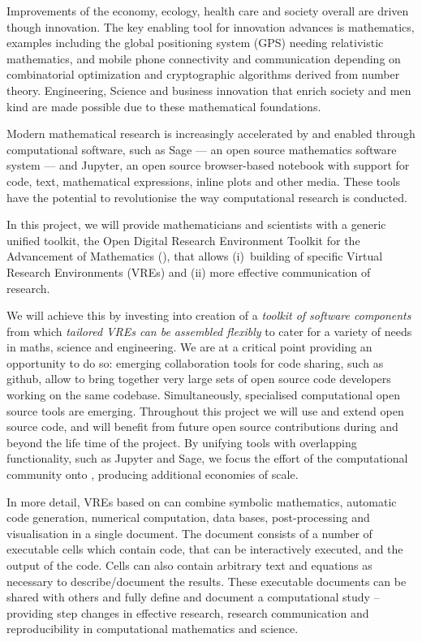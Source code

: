 Improvements of the economy, ecology, health care and society overall
are driven though innovation. The key enabling tool for innovation
advances is mathematics, examples including the global positioning
system (GPS) needing relativistic mathematics, and mobile phone
connectivity and communication depending on combinatorial optimization
and cryptographic algorithms derived from number theory. Engineering,
Science and business innovation that enrich society and men kind are
made possible due to these mathematical foundations.

Modern mathematical research is increasingly accelerated by and
enabled through computational software, such as Sage --- an open source
mathematics software system --- and Jupyter, an open source browser-based
notebook with support for code, text, mathematical expressions, inline
plots and other media. These tools have the potential to
revolutionise the way computational research is conducted. 

In this project, we will provide mathematicians and scientists with a
generic unified toolkit, the Open Digital Research Environment Toolkit
for the Advancement of Mathematics (\TheProject), that allows
(i)~building of specific Virtual Research Environments (VREs) and (ii)
more effective communication of research.


We will achieve this by investing into creation of a \emph{toolkit of
  software components} from which \emph{tailored VREs can be assembled
  flexibly} to cater for a variety of needs in maths, science and
engineering.  We are at a critical point providing an opportunity to
do so: emerging collaboration tools for code sharing, such as github,
allow to bring together very large sets of open source code developers
working on the same codebase. Simultaneously, specialised
computational open source tools are emerging. Throughout this project
we will use and extend open source code, and \TheProject will benefit
from future open source contributions during and beyond the life time
of the project. By unifying tools with overlapping functionality, such as Jupyter and Sage, we
focus the effort of the computational community onto \TheProject, producing additional economies of scale. 

In more detail, VREs based on \TheProject can combine symbolic
mathematics, automatic code generation, numerical computation, data
bases, post-processing and visualisation in a single document. The
document consists of a number of executable cells which contain code,
that can be interactively executed, and the output of the code. Cells
can also contain arbitrary text and equations as necessary to
describe/document the results. These executable documents can be
shared with others and fully define and document a computational study
-- providing step changes in effective research, research
communication and reproducibility in computational mathematics and science. 


